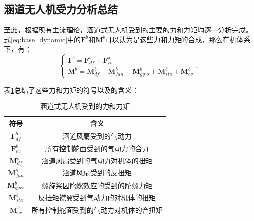 \subsection{涵道无人机受力分析总结}
至此，根据现有主流理论，涵道式无人机受到的主要的力和力矩均逐一分析完成。式\eqref{eq:base_dynamic}中的$\boldsymbol{F}^b$和$\boldsymbol{M}^b$可以认为是这些力和力矩的合成，那么在机体系下，有：
\begin{equation}
    \begin{cases}
        \boldsymbol{F}^b = \boldsymbol{F}_{df}^b + \boldsymbol{F}_{cv}^b \\
        \boldsymbol{M}^b = \boldsymbol{M}_{df}^b + \boldsymbol{M}_{fan}^b + \boldsymbol{M}_{gyro}^b + \boldsymbol{M}_{sta}^b + \boldsymbol{M}_{cv}^b
    \end{cases}.
    \label{eq:total_effort}
\end{equation}

表\ref{tab:F_and_M}总结了这些力和力矩的符号以及的含义：
\begin{table}
    \caption{\label{tab:F_and_M}涵道式无人机受到的力和力矩}
    \centering{}%
    \begin{tabular}{cc}
    \toprule
    符号 & 含义\tabularnewline
    \midrule
    $\boldsymbol{F}_{df}^b$ & 涵道风扇受到的气动力\tabularnewline
    
    $\boldsymbol{F}_{cv}^b$ & 所有控制舵面受到的气动力的合力\tabularnewline

    $\boldsymbol{M}_{df}^b$ & 涵道风扇受到的气动力对机体的扭矩\tabularnewline

    $\boldsymbol{M}_{fan}^b$ & 涵道风扇受到的反扭矩\tabularnewline

    $\boldsymbol{M}_{gyro}^b$ & 螺旋桨因陀螺效应的受到的陀螺力矩\tabularnewline

    $\boldsymbol{M}_{sta}^b$ & 反扭矩襟翼受到气动力的对机体的扭矩\tabularnewline

    $\boldsymbol{M}_{cv}^b$ & 所有控制舵面受到的气动力对机体的合扭矩\tabularnewline
    \bottomrule
    \end{tabular}
\end{table}

